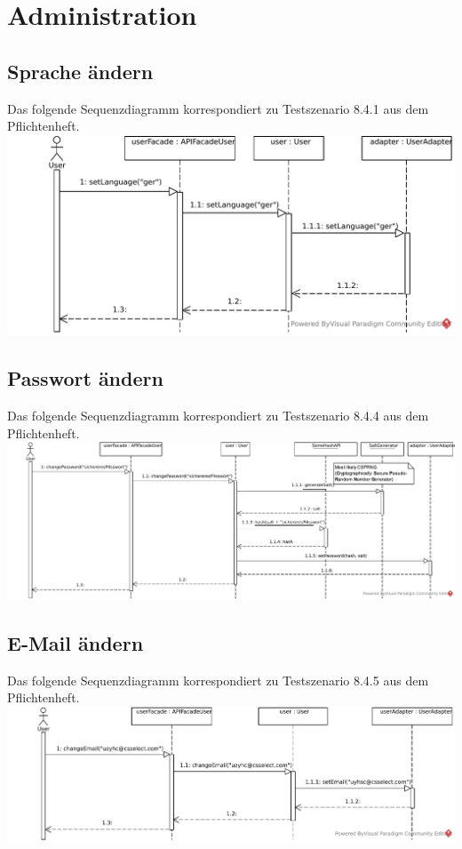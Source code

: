 \documentclass[a4paper]{scrreprt}
\begin{document}
    \section{Administration}
    \subsection{Sprache ändern}
    Das folgende Sequenzdiagramm korrespondiert zu Testszenario 8.4.1 aus dem Pflichtenheft. \\
    \includegraphics[width=\textwidth]{img/SpracheAendern.pdf}

    \subsection{Passwort ändern}
    Das folgende Sequenzdiagramm korrespondiert zu Testszenario 8.4.4 aus dem Pflichtenheft. \\
    \includegraphics[width=\textwidth]{img/PasswordAendern.pdf}

    \subsection{E-Mail ändern}
    Das folgende Sequenzdiagramm korrespondiert zu Testszenario 8.4.5 aus dem Pflichtenheft. \\
    \includegraphics[width=\textwidth]{img/EmailAendern.pdf}
\end{document}
